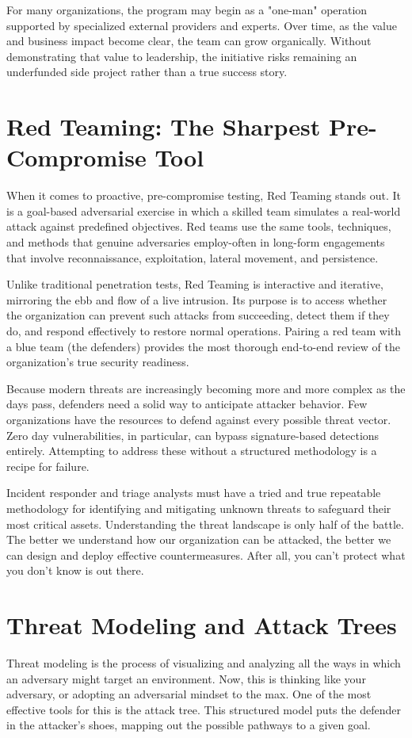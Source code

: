 For many organizations, the program may begin as a "one-man" operation supported by specialized external providers and experts. Over time, as the value and business impact become clear, the team can grow organically. Without demonstrating that value to leadership, the initiative risks remaining an underfunded side project rather than a true success story.

\section{Red Teaming: The Sharpest Pre-Compromise Tool}

When it comes to proactive, pre-compromise testing, Red Teaming stands out. It is a goal-based adversarial exercise in which a skilled team simulates a real-world attack against predefined objectives. Red teams use the same tools, techniques, and methods that genuine adversaries employ-often in long-form engagements that involve reconnaissance, exploitation, lateral movement, and persistence.

Unlike traditional penetration tests, Red Teaming is interactive and iterative, mirroring the ebb and flow of a live intrusion. Its purpose is to access whether the organization can prevent such attacks from succeeding, detect them if they do, and respond effectively to restore normal operations. Pairing a red team with a blue team (the defenders) provides the most thorough end-to-end review of the organization's true security readiness.

Because modern threats are increasingly becoming more and more complex as the days pass, defenders need a solid way to anticipate attacker behavior. Few organizations have the resources to defend against every possible threat vector. Zero day vulnerabilities, in particular, can bypass signature-based detections entirely. Attempting to address these without a structured methodology is a recipe for failure.

Incident responder and triage analysts must have a tried and true repeatable methodology for identifying and mitigating unknown threats to safeguard their most critical assets. Understanding the threat landscape is only half of the battle. The better we understand how our organization can be attacked, the better we can design and deploy effective countermeasures. After all, you can't protect what you don't know is out there.

\section{Threat Modeling and Attack Trees}
Threat modeling is the process of visualizing and analyzing all the ways in which an adversary might target an environment. Now, this is thinking like your adversary, or adopting an adversarial mindset to the max. One of the most effective tools for this is the attack tree. This structured model puts the defender in the attacker's shoes, mapping out the possible pathways to a given goal.

